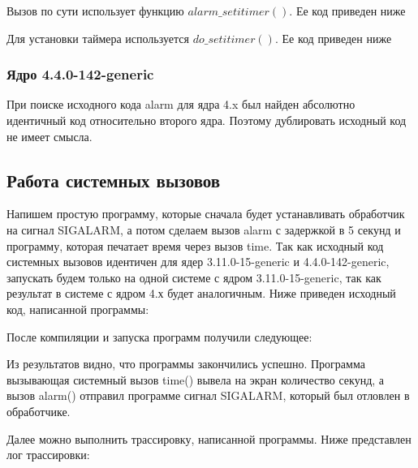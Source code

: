 \par Вызов по сути использует функцию $alarm\_setitimer()$. Ее код приведен ниже



\par Для установки таймера используется $do\_setitimer()$. Ее код приведен ниже




\subsubsection{Ядро 4.4.0-142-generic}

\par При поиске исходного кода alarm для ядра 4.x был найден абсолютно идентичный код относительно второго ядра. Поэтому дублировать исходный код не имеет смысла.


\subsection{Работа системных вызовов} %

\par Напишем простую программу, которые сначала будет устанавливать обработчик на сигнал SIGALARM, а потом сделаем вызов alarm с задержкой в 5 секунд и программу, которая печатает время через вызов time. Так как исходный код системных вызовов идентичен для ядер 3.11.0-15-generic и 4.4.0-142-generic, запускать будем только на одной системе с ядром 3.11.0-15-generic, так как результат в системе с ядром 4.х будет аналогичным. Ниже приведен исходный код, написанной программы:





\par После компиляции и запуска программ получили следующее:






\par Из результатов видно, что программы закончились успешно. Программа вызывающая системный вызов time() вывела на экран количество секунд, а вызов alarm() отправил программе сигнал SIGALARM, который был отловлен в обработчике.

\par Далее можно выполнить трассировку, написанной программы. Ниже представлен лог трассировки:

